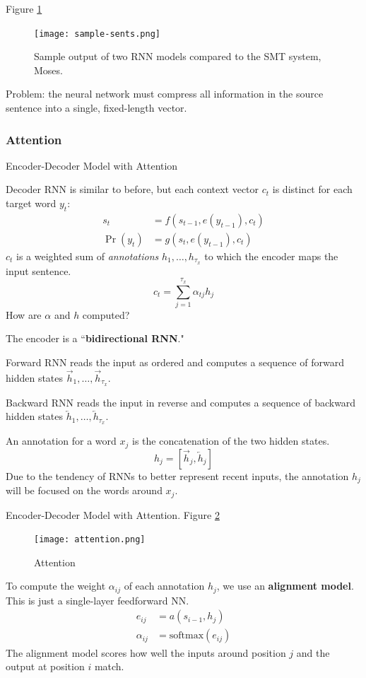 \documentclass[english]{article}
\begin{document}
 

\item   Figure \ref{Sample-rnn}

\begin{figure}
\centering
\texttt{[image: sample-sents.png]}
\caption{Sample output of two RNN models compared to the SMT system, Moses.}
\label{Sample-rnn}
\end{figure}
Problem: the neural network must compress all information in the source sentence into a single, fixed-length vector.
 \eenum

\subsubsection{Attention}
\benum
\item 
 {Encoder-Decoder Model with Attention}

Decoder RNN is similar to before, but each context vector $c_t$ is distinct for each target word $y_t$:
\begin{align*}
s_t &= f(s_{t-1}, e(y_{t-1}), c_t)\\
\Pr(y_t) &= g(s_t, e(y_{t-1}), c_t)
\end{align*}
$c_t$ is a weighted sum of \textit{annotations} $h_1,\dots,h_{\tau_x}$ to which the encoder maps the input sentence.
$$c_t = \sum_{j=1}^{\tau_x} \alpha_{tj}h_j$$
How are $\alpha$ and $h$ computed?
 

\item 
The encoder is a ``\textbf{bidirectional RNN}."
 
Forward RNN reads the input as ordered and computes a sequence of forward hidden states $\overrightarrow{h}_1,\dots,\overrightarrow{h}_{\tau_x}$.
 
Backward RNN reads the input in reverse and computes a sequence of backward hidden states $\overleftarrow{h}_1,\dots,\overleftarrow{h}_{\tau_x}$.
 
An annotation for a word $x_j$ is the concatenation of the two hidden states.
$$h_j=\left[\overrightarrow{h}_j, \overleftarrow{h}_j\right]$$
Due to the tendency of RNNs to better represent recent inputs, the annotation $h_j$ will be focused on the words around $x_j$.
 

\item 
 {Encoder-Decoder Model with Attention}.  Figure \ref{Attention}

\begin{figure}
\centering
\texttt{[image: attention.png]}
\caption{Attention}
\label{Attention}
\end{figure}
To compute the weight $\alpha_{ij}$ of each annotation $h_j$, we use an \textbf{alignment model}. This is just a single-layer feedforward NN.
\begin{align*}
e_{ij} &= a(s_{i-1}, h_j)\\
\alpha_{ij} &= \text{softmax}(e_{ij})
\end{align*}
The alignment model scores how well the inputs around position $j$ and the output at position $i$ match.
\end{document}
